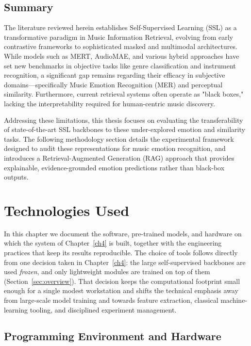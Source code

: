 \documentclass[12pt]{report}
\begin{document}
\section{Summary}

The literature reviewed herein establishes Self-Supervised Learning (SSL) as a transformative paradigm in Music Information Retrieval, evolving from early contrastive frameworks to sophisticated masked and multimodal architectures. While models such as MERT, AudioMAE, and various hybrid approaches have set new benchmarks in objective tasks like genre classification and instrument recognition, a significant gap remains regarding their efficacy in subjective domains—specifically Music Emotion Recognition (MER) and perceptual similarity. Furthermore, current retrieval systems often operate as "black boxes," lacking the interpretability required for human-centric music discovery.

Addressing these limitations, this thesis focuses on evaluating the transferability of state-of-the-art SSL backbones to these under-explored emotion and similarity tasks. The following methodology section details the experimental framework designed to audit these representations for music emotion recognition, and introduces a Retrieval-Augmented Generation (RAG) approach that provides explainable, evidence-grounded emotion predictions rather than black-box outputs.


% 
% 

\chapter{Technologies Used}
\label{ch3}

In this chapter we document the software, pre-trained models, and hardware on which the system of Chapter~\ref{ch4} is built, together with the engineering practices that keep its results reproducible. The choice of tools follows directly from one decision taken in Chapter~\ref{ch4}: the large self-supervised backbones are used \emph{frozen}, and only lightweight modules are trained on top of them (Section~\ref{sec:overview}). That decision keeps the computational footprint small enough for a single modest workstation and shifts the technical emphasis away from large-scale model training and towards feature extraction, classical machine-learning tooling, and disciplined experiment management.

\section{Programming Environment and Hardware}
\end{document}
